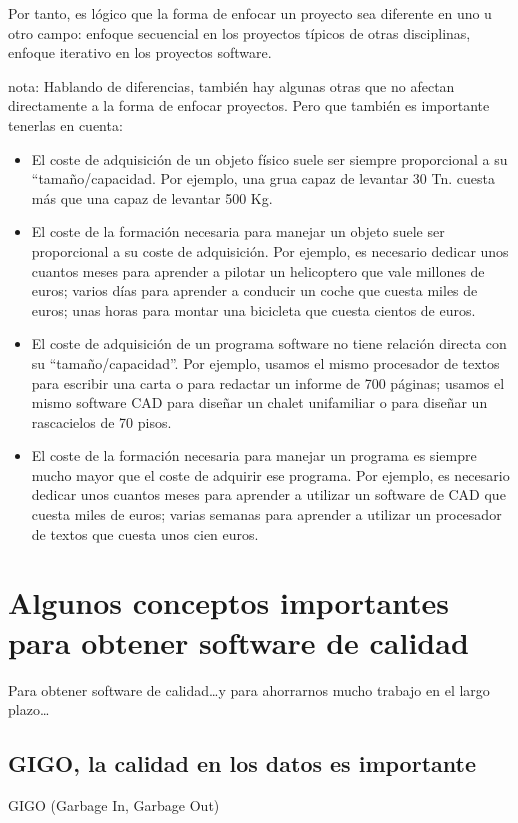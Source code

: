 \documentclass[spanish,12pt,a4paper,final,oneside]{book}
\begin{document}
Por tanto, es lógico que la forma de enfocar un proyecto sea diferente en uno u otro campo: enfoque secuencial en los proyectos típicos de otras disciplinas, enfoque iterativo en los proyectos software.

nota: Hablando de diferencias, también hay algunas otras que no afectan directamente a la forma de enfocar proyectos. Pero que también es importante tenerlas en cuenta:
\begin{itemize}
\item El coste de adquisición de un objeto físico suele ser siempre proporcional a su ``tamaño/capacidad. Por ejemplo, una grua capaz de levantar 30 Tn. cuesta más que una capaz de levantar 500 Kg.
\item El coste de la formación necesaria para manejar un objeto suele ser proporcional a su coste de adquisición. Por ejemplo, es necesario dedicar unos cuantos meses para aprender a pilotar un helicoptero que vale millones de euros; varios días para aprender a conducir un coche que cuesta miles de euros; unas horas para montar una bicicleta que cuesta cientos de euros.
\item El coste de adquisición de un programa software no tiene relación directa con su ``tamaño/capacidad''. Por ejemplo, usamos el mismo procesador de textos para escribir una carta o para redactar un informe de 700 páginas; usamos el mismo software CAD para diseñar un chalet unifamiliar o para diseñar un rascacielos de 70 pisos.
\item El coste de la formación necesaria para manejar un programa es siempre mucho mayor que el coste de adquirir ese programa. Por ejemplo, es necesario dedicar unos cuantos meses para aprender a utilizar un software de CAD que cuesta miles de euros; varias semanas para aprender a utilizar un procesador de textos que cuesta unos cien euros.
\end{itemize}


\chapter{Algunos conceptos importantes para obtener software de calidad}

Para obtener software de calidad\ldots y para ahorrarnos mucho trabajo en el largo plazo\ldots


\section{GIGO, la calidad en los datos es importante}
GIGO (Garbage In, Garbage Out)
\end{document}
